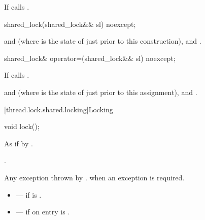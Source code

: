 \begin{itemdescr}
\pnum
\effects
If  calls .
\end{itemdescr}

%
\begin{itemdecl}
shared_lock(shared_lock&& sl) noexcept;
\end{itemdecl}

\begin{itemdescr}
\pnum
\ensures
{} and  (where
 is the state of  just prior to this construction),
 and .
\end{itemdescr}

%
\begin{itemdecl}
shared_lock& operator=(shared_lock&& sl) noexcept;
\end{itemdecl}

\begin{itemdescr}
\pnum
\effects
If  calls .

\pnum
\ensures
{} and  (where
 is the state of  just prior to this assignment),
 and .
\end{itemdescr}

[thread.lock.shared.locking]{Locking}

%
\begin{itemdecl}
void lock();
\end{itemdecl}

\begin{itemdescr}
\pnum
\effects
As if by .

\pnum
\ensures
{}.

\pnum
\throws
Any exception thrown by .
 when an exception is required.

\pnum
\errors
\begin{itemize}
\item {} --- if  is .
\item {} --- if on entry  is
.
\end{itemize}
\end{itemdescr}


